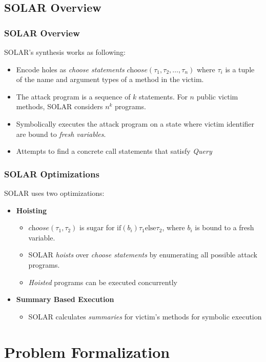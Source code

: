\documentclass{beamer}
\newcommand{\hole}{\textit{choose}}
\begin{document}
\subsection{SOLAR Overview}
\begin{frame}
  \frametitle{SOLAR Overview}
  SOLAR's synthesis works as following:
  \begin{itemize}
    \item Encode holes as \textit{choose statements} $\hole(\tau_1, \tau_2, \dots, \tau_n)$
      where $\tau_i$ is a tuple of the name and argument types
      of a method in the victim.
    \item The attack program is a sequence of $k$ statements.
      For $n$ public victim methods, SOLAR considers $n^k$
      programs.
    \item Symbolically executes the attack program on a state
      where victim identifier are bound to \textit{fresh variables}.
    \item Attempts to find a concrete call statements that satisfy \textit{Query}

  \end{itemize}
\end{frame}
\begin{frame}
  \frametitle{SOLAR Optimizations}
  SOLAR uses two optimizations:
      \begin{itemize}
        \item \textbf{Hoisting}
        \begin{itemize}
          \item $\hole(\tau_1, \tau_2)$ is sugar for
            $\text{if}(b_i) \tau_1 \text{else} \tau_2$,
            where $b_i$ is bound to a fresh variable.
          \item SOLAR \textit{hoists} over \textit{choose statements} by
            enumerating all possible attack programs.
          \item \textit{Hoisted} programs can be executed concurrently
      \end{itemize}
    \item \textbf{Summary Based Execution}
      \begin{itemize}
        \item SOLAR calculates \textit{summaries} for victim's
          methods for symbolic execution
      \end{itemize}
  \end{itemize}
\end{frame}


\section{Problem Formalization}
\end{document}
